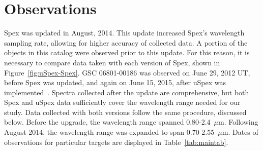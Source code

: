 \section{Observations}





Spex was updated in August, 2014.  This update increased Spex's wavelength sampling rate, allowing for higher accuracy of collected data.  
A portion of the objects in this catalog were observed prior to this update.  For this reason, it is necessary to compare data taken with each version of Spex, shown in Figure~\ref{fig:uSpex-Spex}.  
GSC 06801-00186 was observed on June 29, 2012 UT, before Spex was updated, and again on June 15, 2015, after uSpex was implemented~\cite{Spextool_Manual_Cushing_2015}.  %
Spectra collected after the update are comprehensive, but both Spex and uSpex data sufficiently cover the wavelength range needed for our study.
Data collected with both versions follow the same procedure, discussed below.  Before the upgrade, the wavelength range spanned 0.80-2.4~$\mu$m.  Following August 2014, the wavelength range was expanded to span 0.70-2.55~$\mu$m.  Dates of observations for particular targets are displayed in Table~\ref{tab:maintab}.\\



